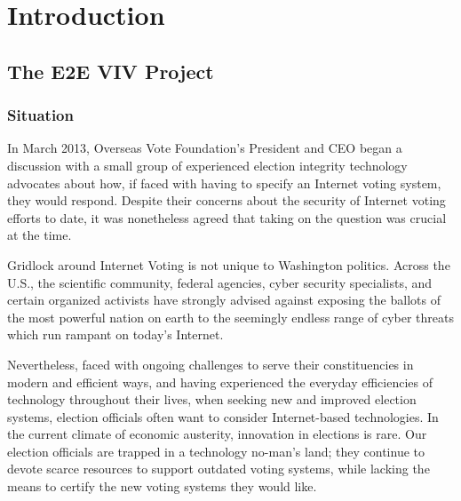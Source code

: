 \chapter{Introduction}
\label{chapter:introduction}


\section{The E2E VIV Project}
\label{sec:e2e-viv-project}

\subsection{Situation}
\label{sec:situation}

In March 2013, Overseas Vote Foundation’s President and CEO began a
discussion with a small group of experienced election integrity
technology advocates about how, if faced with having to specify an
Internet voting system, they would respond. Despite their concerns
about the security of Internet voting efforts to date, it was
nonetheless agreed that taking on the question was crucial at the
time.

Gridlock around Internet Voting is not unique to Washington
politics. Across the U.S., the scientific community, federal agencies,
cyber security specialists, and certain organized activists have
strongly advised against exposing the ballots of the most powerful
nation on earth to the seemingly endless range of cyber threats which
run rampant on today’s Internet.

Nevertheless, faced with ongoing challenges to serve their
constituencies in modern and efficient ways, and having experienced
the everyday efficiencies of technology throughout their lives, when
seeking new and improved election systems, election officials often
want to consider Internet-based technologies. In the current climate
of economic austerity, innovation in elections is rare. Our election
officials are trapped in a technology no-man’s land; they continue to
devote scarce resources to support outdated voting systems, while
lacking the means to certify the new voting systems they would like.

